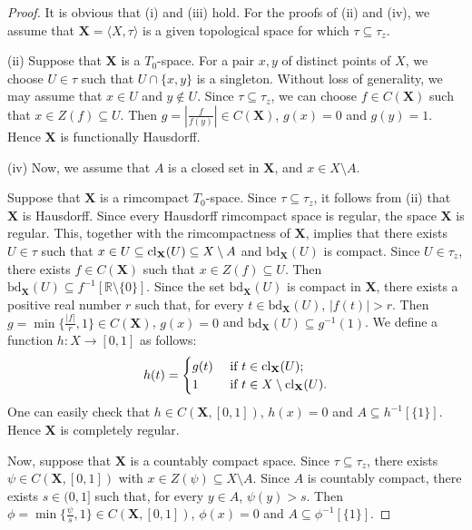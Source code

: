 \documentclass[12pt,twoside,leqno]{article}
\theoremstyle{plain}
\theoremstyle{definition}
\theoremstyle{remark}
\DeclareMathOperator{\cl}{{\rm cl}}
\begin{document}
\begin{proof}
	It is obvious that (i) and (iii) hold. For the proofs of (ii) and (iv), we assume that $\mathbf{X}=\langle X, \tau\rangle$ is a given topological space for which $\tau\subseteq\tau_z$.\medspace
	
	(ii) Suppose that $\mathbf{X}$ is a $T_0$-space. For a pair $x,y$ of distinct points of $X$, we choose $U\in\tau$ such that $U\cap\{x,y\}$ is a singleton.  Without loss of generality,  we may assume that $x\in U$ and $y\notin U$. Since $\tau\subseteq\tau_z$, we can choose $f\in C(\mathbf{X})$ such that $x\in Z(f)\subseteq U$.  Then $g=|\frac{f}{f(y)}|\in C(\mathbf{X})$, $g(x)=0$ and $g(y)=1$. Hence $\mathbf{X}$ is functionally Hausdorff.\medspace
	
	(iv)  Now, we assume that $A$ is a closed set in $\mathbf{X}$, and  $x\in X\setminus A$. 
	
	Suppose that $\mathbf{X}$ is a rimcompact  $T_0$-space. Since $\tau\subseteq\tau_z$, it follows from (ii) that $\mathbf{X}$ is Hausdorff. Since every Hausdorff rimcompact space is regular, the space $\mathbf{X}$ is regular. This, together with the rimcompactness of $\mathbf{X}$, implies that there exists $U\in\tau$ such that $x\in U\subseteq\cl_{\mathbf{X}}(U)\subseteq X\setminus A$ and $\text{bd}_{\mathbf{X}}(U)$ is compact.  Since $U\in\tau_z$, there exists $f\in C(\mathbf{X})$ such that $x\in Z(f)\subseteq U$. Then $\text{bd}_{\mathbf{X}}(U)\subseteq f^{-1}[\mathbb{R}\setminus \{0\}]$. Since the set $\text{bd}_{\mathbf{X}}(U)$ is compact in $\mathbf{X}$, there exists a positive real number $r$ such that, for every $t\in \text{bd}_{\mathbf{X}}(U)$, $|f(t)|>r$. Then $g=\min\{\frac{|f|}{r}, 1\}\in C(\mathbf{X})$, $g(x)=0$ and $\text{bd}_{\mathbf{X}}(U)\subseteq g^{-1}(1)$. We define a function $h: X\to [0,1]$ as follows:
	$$
	h(t)=\begin{cases} g(t) &\text{ if } t\in \cl_{\mathbf{X}}(U);\\
		1 &\text{ if } t\in X\setminus\cl_{\mathbf{X}}(U).\end{cases}
	$$
	One can easily check that $h\in C(\mathbf{X}, [0,1])$, $h(x)=0$ and $A\subseteq h^{-1}[\{1\}]$. Hence $\mathbf{X}$ is completely regular.
	
	Now, suppose that $\mathbf{X}$ is a countably compact space. Since $\tau\subseteq\tau_z$, there exists $\psi\in C(\mathbf{X}, [0,1])$ with $x\in Z(\psi)\subseteq X\setminus A$. Since $A$ is countably compact, there exists $s\in (0, 1]$ such that, for every $y\in A$, $\psi(y)>s$. Then $\phi=\min\{\frac{\psi}{s}, 1\}\in C(\mathbf{X}, [0,1])$, $\phi(x)=0$ and $A\subseteq \phi^{-1}[\{1\}]$.\medspace
	

\end{proof}
\end{document}
